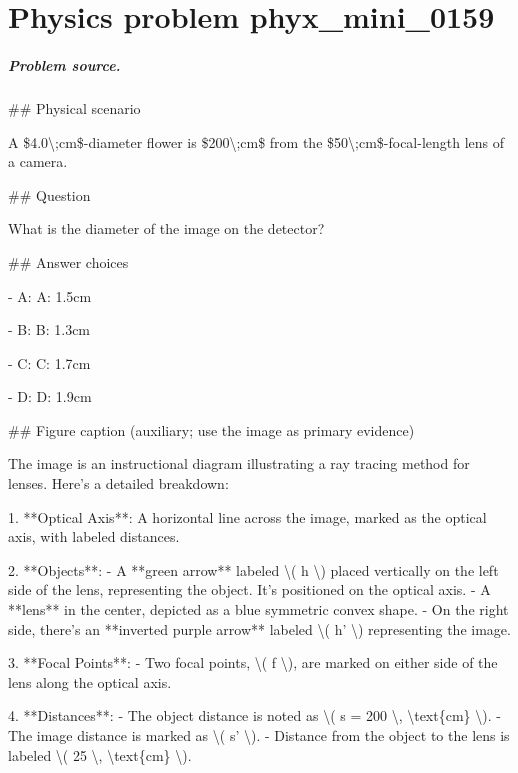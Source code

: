 
\chapter{Physics problem phyx\_mini\_0159}
\label{ch:PhyXMiniProblems_problem_phyx_mini_0159}

\paragraph{Problem source.}
\#\# Physical scenario

A \$4.0\textbackslash{};cm\$-diameter flower is \$200\textbackslash{};cm\$ from the \$50\textbackslash{};cm\$-focal-length lens of a camera.

\#\# Question

What is the diameter of the image on the detector?

\#\# Answer choices

- A: A: 1.5cm

- B: B: 1.3cm

- C: C: 1.7cm

- D: D: 1.9cm

\#\# Figure caption (auxiliary; use the image as primary evidence)

The image is an instructional diagram illustrating a ray tracing method for lenses. Here’s a detailed breakdown:

1. **Optical Axis**: A horizontal line across the image, marked as the optical axis, with labeled distances.

2. **Objects**:
   - A **green arrow** labeled \textbackslash{}( h \textbackslash{}) placed vertically on the left side of the lens, representing the object. It’s positioned on the optical axis.
   - A **lens** in the center, depicted as a blue symmetric convex shape.
   - On the right side, there’s an **inverted purple arrow** labeled \textbackslash{}( h' \textbackslash{}) representing the image.

3. **Focal Points**:
   - Two focal points, \textbackslash{}( f \textbackslash{}), are marked on either side of the lens along the optical axis. 

4. **Distances**:
   - The object distance is noted as \textbackslash{}( s = 200 \textbackslash{}, \textbackslash{}text\{cm\} \textbackslash{}).
   - The image distance is marked as \textbackslash{}( s' \textbackslash{}).
   - Distance from the object to the lens is labeled \textbackslash{}( 25 \textbackslash{}, \textbackslash{}text\{cm\} \textbackslash{}).

